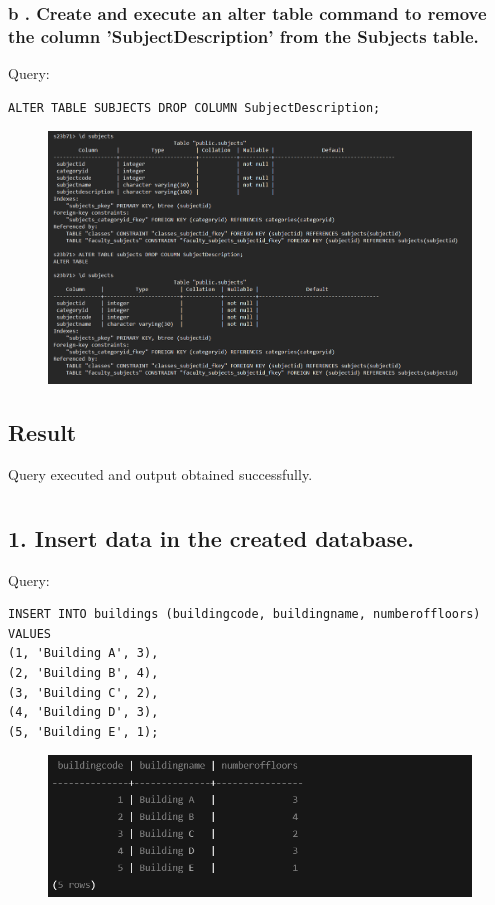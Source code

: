 \documentclass{article}
\begin{document}
\subsubsection* {b . Create and execute an alter table command to remove the column 'SubjectDescription' from the Subjects table.}
Query:
\begin{Verbatim}[frame=single,framerule=1pt,fontfamily=courier,fontsize=\small]
ALTER TABLE SUBJECTS DROP COLUMN SubjectDescription;
\end{Verbatim}
\begin{figure}[H]
    \centering
    \includegraphics[width=\textwidth]{cycle1/1.3.3.png}
\end{figure}

\subsection*{Result}
Query executed and output obtained successfully.

\newpage
\section*{}

\subsection*{1. Insert data in the created database.}
Query:
\begin{Verbatim}[frame=single,framerule=1pt,fontfamily=courier,fontsize=\small]
INSERT INTO buildings (buildingcode, buildingname, numberoffloors) VALUES 
(1, 'Building A', 3),
(2, 'Building B', 4),
(3, 'Building C', 2),
(4, 'Building D', 3),
(5, 'Building E', 1);
\end{Verbatim}
\begin{figure}[H]
    \centering
    \includegraphics[width=\textwidth]{select/buildings.png}
\end{figure}
\end{document}
